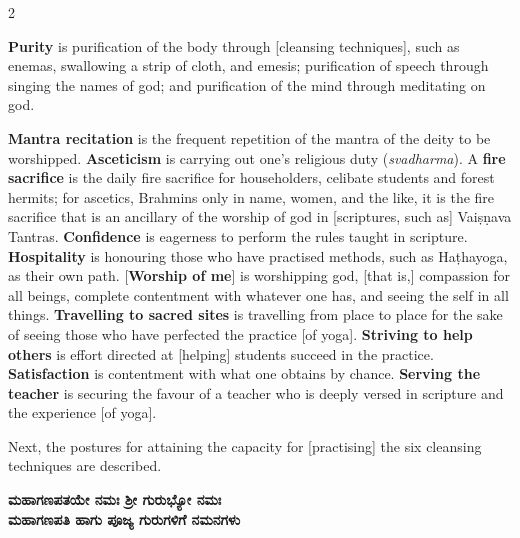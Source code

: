 \begin{nohyp}
\begin{multicols}{2}
\begin{eng}
\textbf{Purity} is purification of the body through [cleansing techniques], such as enemas, swallowing a strip of cloth, and emesis; purification of speech through singing the names of god; and purification of the mind through meditating on god. 

\textbf{Mantra recitation} is the frequent repetition of the mantra of the deity to be worshipped. \textbf{Asceticism} is carrying out one’s religious duty (\textit{svadharma}). A \textbf{fire sacrifice} is the daily fire sacrifice for householders, celibate students and forest hermits;  for ascetics, Brahmins only in name, women, and the like, it is the fire sacrifice that is an ancillary of the worship of god in [scriptures, such as] Vaiṣṇava Tantras. \textbf{Confidence} is eagerness to perform the rules taught in scripture. \textbf{Hospitality} is honouring those who have practised  methods, such as Haṭhayoga, as their own path. [\textbf{Worship of me}] is worshipping god, [that is,] compassion for all beings, complete contentment with whatever one has, and seeing the self in all things. \textbf{Travelling to sacred sites} is travelling from place to place for the sake of seeing those who have perfected the practice [of yoga].  \textbf{Striving to help others} is effort directed at [helping] students succeed in the practice.  \textbf{Satisfaction} is contentment with what one obtains by chance. \textbf{Serving the teacher} is securing the favour of a teacher who is deeply versed in scripture and the experience [of yoga].
\vskip 7pt


Next, the postures for attaining the capacity for [practising] the six cleansing techniques are described.
\end{eng}
\end{multicols}
\end{nohyp}


\newpage
\null\vspace{0.1cm}


\begin{kan}
\centerline{}
\medskip

\begin{center}
{\Large\bfseries ಮಹಾಗಣಪತಯೇ ನಮಃ  ಶ್ರೀ ಗುರುಭ್ಯೋ ನಮಃ}\\
{\Large\bfseries ಮಹಾಗಣಪತಿ ಹಾಗು ಪೂಜ್ಯ ಗುರುಗಳಿಗೆ ನಮನಗಳು}
\end{center}
\end{kan}
\medskip



